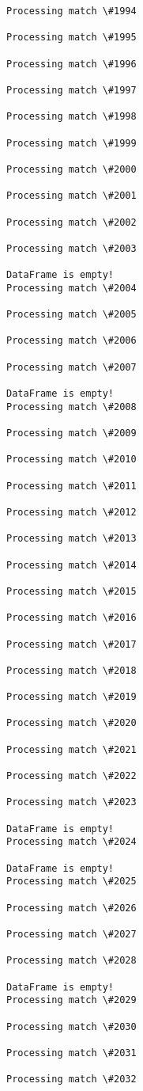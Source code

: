 \documentclass[11pt]{article}
\begin{document}
\begin{Verbatim}[commandchars=\\\{\}]
Processing match \#1994

Processing match \#1995

Processing match \#1996

Processing match \#1997

Processing match \#1998

Processing match \#1999

Processing match \#2000

Processing match \#2001

Processing match \#2002

Processing match \#2003

DataFrame is empty!
Processing match \#2004

Processing match \#2005

Processing match \#2006

Processing match \#2007

DataFrame is empty!
Processing match \#2008

Processing match \#2009

Processing match \#2010

Processing match \#2011

Processing match \#2012

Processing match \#2013

Processing match \#2014

Processing match \#2015

Processing match \#2016

Processing match \#2017

Processing match \#2018

Processing match \#2019

Processing match \#2020

Processing match \#2021

Processing match \#2022

Processing match \#2023

DataFrame is empty!
Processing match \#2024

DataFrame is empty!
Processing match \#2025

Processing match \#2026

Processing match \#2027

Processing match \#2028

DataFrame is empty!
Processing match \#2029

Processing match \#2030

Processing match \#2031

Processing match \#2032


\end{Verbatim}
\end{document}
